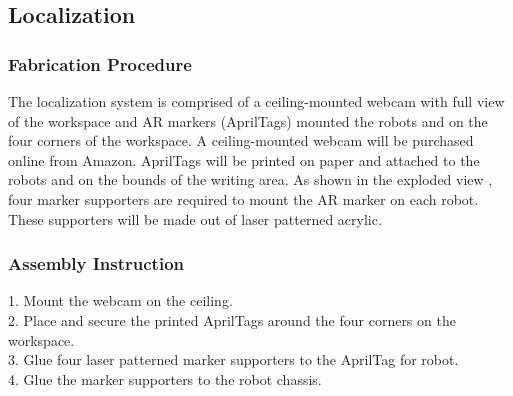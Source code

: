 
\subsection{Localization}
\label{sec:hardware_localization}

\subsubsection{Fabrication Procedure}
\label{sec:localization_fab}
The localization system is comprised of a ceiling-mounted webcam with full view of the workspace and AR markers (AprilTags) mounted the robots and on the four corners of the workspace. A ceiling-mounted webcam will be purchased online from Amazon. AprilTags will be printed on paper and attached to the robots and on the bounds of the writing area. As shown in the exploded view , four marker supporters are required to mount the AR marker on each robot. These supporters will be made out of laser patterned acrylic.

\subsubsection{Assembly Instruction}
\label{sec:localization_assemb}
1. Mount the webcam on the ceiling.\\
2. Place and secure the printed AprilTags around the four corners on the workspace.\\
3. Glue four laser patterned marker supporters to the AprilTag for robot.\\
4. Glue the marker supporters to the robot chassis.

